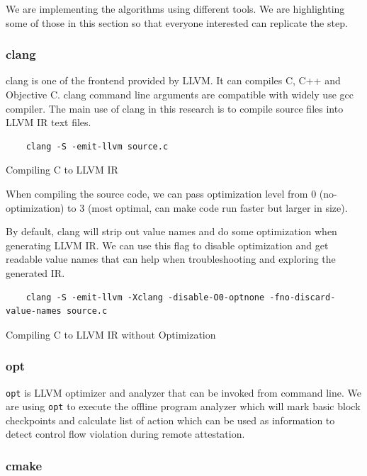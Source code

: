 We are implementing the algorithms using different tools. We are highlighting some of those in this section so that everyone interested can replicate the step.

\subsubsection{clang}

clang is one of the frontend provided by LLVM. It can compiles C, C++ and Objective C. clang command line arguments are compatible with widely use gcc compiler. The main use of clang in this research is to compile source files into LLVM IR text files.

\begin{listing}
\begin{verbatim}
    clang -S -emit-llvm source.c
\end{verbatim}
\caption{Compiling C to LLVM IR}    
\label{listing:2-7}
\end{listing}
    
When compiling the source code, we can pass optimization level from 0 (no-optimization) to 3 (most optimal, can make code run faster but larger in size).  

By default, clang will strip out value names and do some optimization when generating LLVM IR. We can use this flag to disable optimization and get readable value names that can help when troubleshooting and exploring the generated IR.

\begin{listing}
\begin{verbatim}
    clang -S -emit-llvm -Xclang -disable-O0-optnone -fno-discard-value-names source.c
\end{verbatim}
\caption{Compiling C to LLVM IR without Optimization}    
\label{listing:2-8}
\end{listing}

\subsubsection{opt}

\texttt{opt} is LLVM optimizer and analyzer that can be invoked from command line. We are using \texttt{opt} to execute the offline program analyzer which will mark basic block checkpoints and calculate list of action which can be used as information to detect control flow violation during remote attestation.

\subsubsection{cmake}

